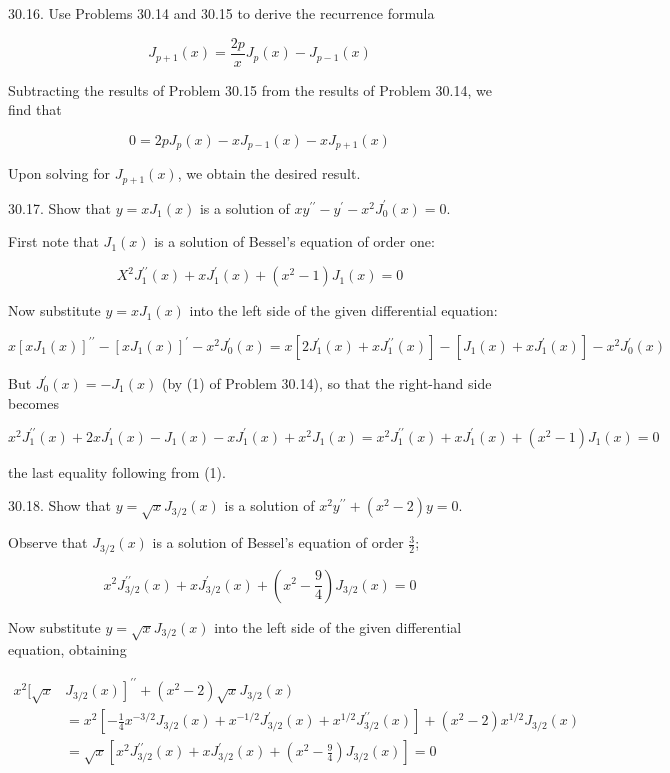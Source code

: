 \documentclass[10pt]{article}
\begin{document}
30.16. Use Problems 30.14 and 30.15 to derive the recurrence formula

$$
J_{p+1}(x)=\frac{2 p}{x} J_{p}(x)-J_{p-1}(x)
$$

Subtracting the results of Problem 30.15 from the results of Problem 30.14, we find that

$$
0=2 p J_{p}(x)-x J_{p-1}(x)-x J_{p+1}(x)
$$

Upon solving for $J_{p+1}(x)$, we obtain the desired result.

30.17. Show that $y=x J_{1}(x)$ is a solution of $x y^{\prime \prime}-y^{\prime}-x^{2} J_{0}^{\prime}(x)=0$.

First note that $J_{1}(x)$ is a solution of Bessel's equation of order one:


\begin{equation*}
X^{2} J_{1}^{\prime \prime}(x)+x J_{1}^{\prime}(x)+\left(x^{2}-1\right) J_{1}(x)=0 \tag{1}
\end{equation*}


Now substitute $y=x J_{1}(x)$ into the left side of the given differential equation:

$$
x\left[x J_{1}(x)\right]^{\prime \prime}-\left[x J_{1}(x)\right]^{\prime}-x^{2} J_{0}^{\prime}(x)=x\left[2 J_{1}^{\prime}(x)+x J_{1}^{\prime \prime}(x)\right]-\left[J_{1}(x)+x J_{1}^{\prime}(x)\right]-x^{2} J_{0}^{\prime}(x)
$$

But $J_{0}^{\prime}(x)=-J_{1}(x)$ (by (1) of Problem 30.14), so that the right-hand side becomes

$$
x^{2} J_{1}^{\prime \prime}(x)+2 x J_{1}^{\prime}(x)-J_{1}(x)-x J_{1}^{\prime}(x)+x^{2} J_{1}(x)=x^{2} J_{1}^{\prime \prime}(x)+x J_{1}^{\prime}(x)+\left(x^{2}-1\right) J_{1}(x)=0
$$

the last equality following from (1).

30.18. Show that $y=\sqrt{x} J_{3 / 2}(x)$ is a solution of $x^{2} y^{\prime \prime}+\left(x^{2}-2\right) y=0$.

Observe that $J_{3 / 2}(x)$ is a solution of Bessel's equation of order $\frac{3}{2}$;


\begin{equation*}
x^{2} J_{3 / 2}^{\prime \prime}(x)+x J_{3 / 2}^{\prime}(x)+\left(x^{2}-\frac{9}{4}\right) J_{3 / 2}(x)=0 \tag{1}
\end{equation*}


Now substitute $y=\sqrt{x} J_{3 / 2}(x)$ into the left side of the given differential equation, obtaining

$$
\begin{aligned}
x^{2}[\sqrt{x} & \left.J_{3 / 2}(x)\right]^{\prime \prime}+\left(x^{2}-2\right) \sqrt{x} J_{3 / 2}(x) \\
& =x^{2}\left[-\frac{1}{4} x^{-3 / 2} J_{3 / 2}(x)+x^{-1 / 2} J_{3 / 2}^{\prime}(x)+x^{1 / 2} J_{3 / 2}^{\prime \prime}(x)\right]+\left(x^{2}-2\right) x^{1 / 2} J_{3 / 2}(x) \\
& =\sqrt{x}\left[x^{2} J_{3 / 2}^{\prime \prime}(x)+x J_{3 / 2}^{\prime}(x)+\left(x^{2}-\frac{9}{4}\right) J_{3 / 2}(x)\right]=0
\end{aligned}
$$
\end{document}
